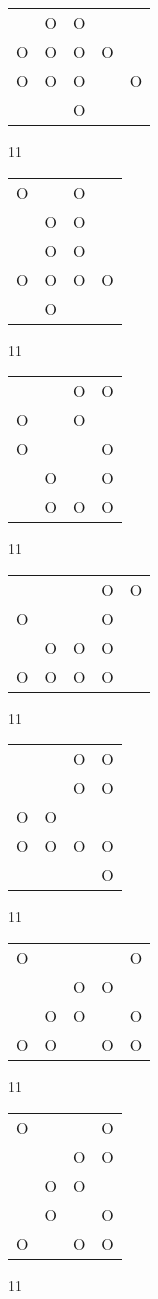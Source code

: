 \begin{tabular}{|m{0.2cm}m{0.2cm}m{0.2cm}m{0.2cm}m{0.2cm}|}\hline
 &O&O& & \\
O&O&O&O& \\
O&O&O& &O\\
 & &O& & \\
\hline\end{tabular}11
\begin{tabular}{|m{0.2cm}m{0.2cm}m{0.2cm}m{0.2cm}|}\hline
O& &O& \\
 &O&O& \\
 &O&O& \\
O&O&O&O\\
 &O& & \\
\hline\end{tabular}11
\begin{tabular}{|m{0.2cm}m{0.2cm}m{0.2cm}m{0.2cm}|}\hline
 & &O&O\\
O& &O& \\
O& & &O\\
 &O& &O\\
 &O&O&O\\
\hline\end{tabular}11
\begin{tabular}{|m{0.2cm}m{0.2cm}m{0.2cm}m{0.2cm}m{0.2cm}|}\hline
 & & &O&O\\
O& & &O& \\
 &O&O&O& \\
O&O&O&O& \\
\hline\end{tabular}11
\begin{tabular}{|m{0.2cm}m{0.2cm}m{0.2cm}m{0.2cm}|}\hline
 & &O&O\\
 & &O&O\\
O&O& & \\
O&O&O&O\\
 & & &O\\
\hline\end{tabular}11
\begin{tabular}{|m{0.2cm}m{0.2cm}m{0.2cm}m{0.2cm}m{0.2cm}|}\hline
O& & & &O\\
 & &O&O& \\
 &O&O& &O\\
O&O& &O&O\\
\hline\end{tabular}11
\begin{tabular}{|m{0.2cm}m{0.2cm}m{0.2cm}m{0.2cm}|}\hline
O& & &O\\
 & &O&O\\
 &O&O& \\
 &O& &O\\
O& &O&O\\
\hline\end{tabular}11
